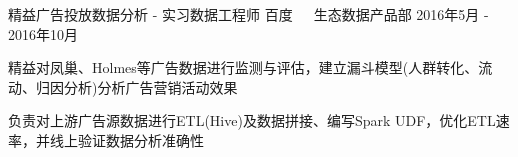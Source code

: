 \documentclass[11pt, a4paper, UTF8]{awesome-cv}
\begin{document}
\begin{cventries}
  \cventry
    {精益广告投放数据分析 - 实习数据工程师} %
    {百度{\ \cdotp\ \ }生态数据产品部} %
    {2016年5月 - 2016年10月} %
    {\ } %
    {
      \begin{cvitems} %
        \item {精益对凤巢、Holmes等广告数据进行监测与评估，建立漏斗模型(人群转化、流动、归因分析)分析广告营销活动效果}
        \item {负责对上游广告源数据进行ETL(Hive)及数据拼接、编写Spark UDF，优化ETL速率，并线上验证数据分析准确性}
      \end{cvitems}
    }
        
\end{cventries}
\end{document}
